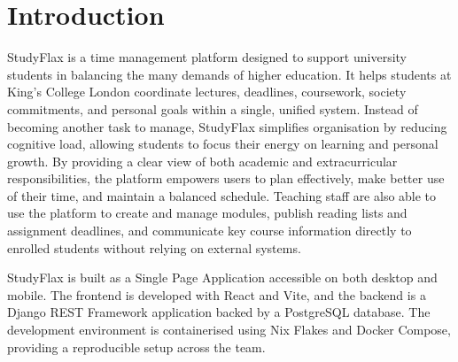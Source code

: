 \chapter{Introduction}
\label{chap:introduction}

StudyFlax is a time management platform designed to support university students in balancing
the many demands of higher education. It helps students at King's College London coordinate
lectures, deadlines, coursework, society commitments, and personal goals within a single,
unified system. Instead of becoming another task to manage, StudyFlax simplifies organisation
by reducing cognitive load, allowing students to focus their energy on learning and personal
growth. By providing a clear view of both academic and extracurricular responsibilities, the
platform empowers users to plan effectively, make better use of their time, and maintain a
balanced schedule. Teaching staff are also able to use the platform to create and manage
modules, publish reading lists and assignment deadlines, and communicate key course information
directly to enrolled students without relying on external systems.

StudyFlax is built as a Single Page Application accessible on both desktop and mobile.
The frontend is developed with React and Vite, and the backend is a Django REST Framework
application backed by a PostgreSQL database. The development environment is containerised
using Nix Flakes and Docker Compose, providing a reproducible setup across the team.
